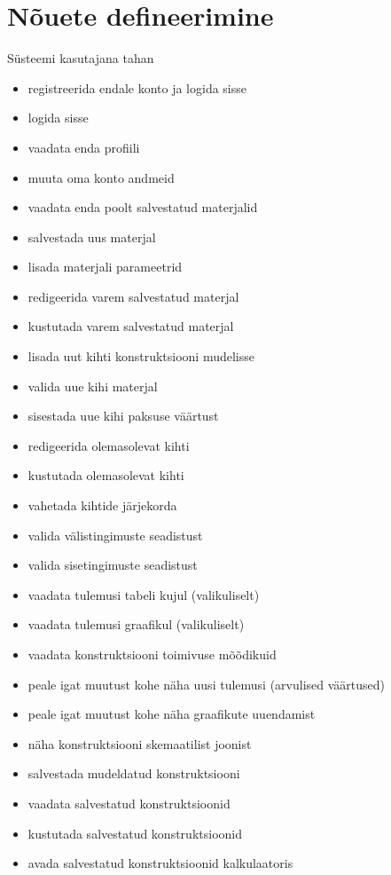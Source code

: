 \section{Nõuete defineerimine}
Süsteemi kasutajana tahan
\begin{itemize}
    \item registreerida endale konto ja logida sisse
    \item logida sisse
    \item vaadata enda profiili
    \item muuta oma konto andmeid
    
    \item vaadata enda poolt salvestatud materjalid
    \item salvestada uus materjal
    \item lisada materjali parameetrid
    \item redigeerida varem salvestatud materjal
    \item kustutada varem salvestatud materjal
    \item lisada uut kihti konstruktsiooni mudelisse
    \item valida uue kihi materjal
    \item sisestada uue kihi paksuse väärtust

    \item redigeerida olemasolevat kihti
    \item kustutada olemasolevat kihti
    \item vahetada kihtide järjekorda
    \item valida välistingimuste seadistust
    \item valida sisetingimuste seadistust
    \item vaadata tulemusi tabeli kujul (valikuliselt)
    \item vaadata tulemusi graafikul (valikuliselt)
    \item vaadata konstruktsiooni toimivuse mõõdikuid
    \item peale igat muutust kohe näha uusi tulemusi (arvulised väärtused)
    \item peale igat muutust kohe näha graafikute uuendamist
    \item näha konstruktsiooni skemaatilist joonist
    \item salvestada mudeldatud konstruktsiooni
    \item vaadata salvestatud konstruktsioonid
    \item kustutada salvestatud konstruktsioonid
    \item avada salvestatud konstruktsioonid kalkulaatoris


\end{itemize}
